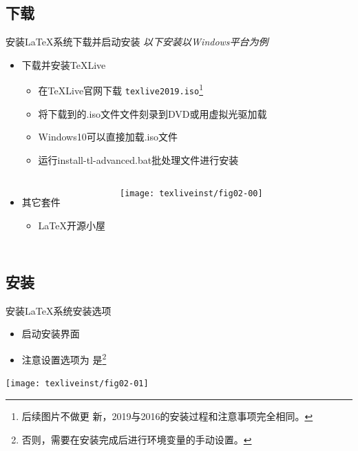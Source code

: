 \documentclass[fontset = adobe, xcolor=svgnames, t, aspectratio=169]{ctexbeamer}
\begin{document}
\subsection[下载]{下载}
\begin{frame}[t]{安装\LaTeX 系统}{下载并启动安装}
  \stretchon
  \emph{以下安装以Windows平台为例}
  \begin{itemize}
  \item 下载并安装\TeX Live
    \begin{itemize}
    \item 在\TeX Live官网下载
      \texttt{texlive2019.iso}\footnote[frame, 1]{后续图片不做更
        新，2019与2016的安装过程和注意事项完全相同。}
    \item 将下载到的.iso文件文件刻录到DVD或用虚拟光驱加载
    \item Windows10可以\alert{直接加载}.iso文件
    \item 运行install-tl-advanced.bat批处理文件进行安装
    \end{itemize}
  \end{itemize}
  \vspace{-3ex}
  \begin{columns}[T]
  \begin{itemize}  
  \item 其它套件
    \begin{itemize}
    \item {\LaTeX 开源小屋}
    \end{itemize}
  \end{itemize}
  \centering%
  \texttt{[image: texliveinst/fig02-00]}
  \end{columns}
  \stretchoff
\end{frame}
\subsection[安装]{安装}
\begin{frame}[t]{安装\LaTeX 系统}{安装选项}
  \begin{itemize}
  \item 启动安装界面
  \item 注意设置选项为
    \alert{是}\footnote[frame, 1]{否则，需要在安装完成后进行环境变量的手动设置。}
  \end{itemize}
  \centering
  \begin{annotatedFigure}
    {\texttt{[image: texliveinst/fig02-01]}}
  \end{annotatedFigure}  
\end{frame}
\end{document}
